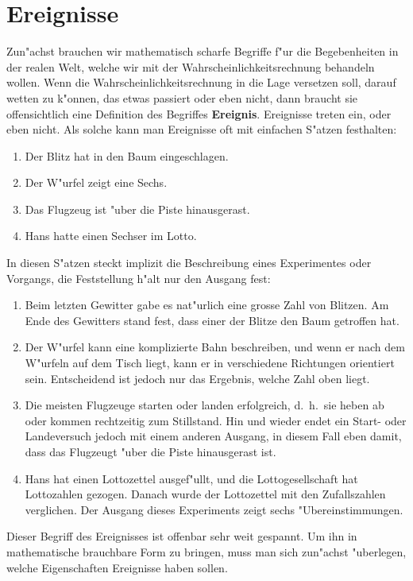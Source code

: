 \section{Ereignisse\label{section-begriffe}}
Zun"achst brauchen wir mathematisch scharfe Begriffe f"ur die Begebenheiten
in der realen Welt, welche wir mit der Wahrscheinlichkeitsrechnung behandeln
wollen. Wenn die Wahrscheinlichkeitsrechnung in die Lage versetzen soll,
darauf wetten zu k"onnen, das etwas passiert oder eben nicht, dann braucht
sie offensichtlich eine Definition des Begriffes {\bf Ereignis}.
Ereignisse treten ein, oder eben nicht.
Als solche kann man Ereignisse oft mit einfachen S"atzen festhalten:
\begin{enumerate}
\item Der Blitz hat in den Baum eingeschlagen.
\item Der W"urfel zeigt eine Sechs.
\item Das Flugzeug ist "uber die Piste hinausgerast.
\item Hans hatte einen Sechser im Lotto.
\end{enumerate}
In diesen S"atzen steckt implizit die Beschreibung eines Experimentes oder
Vorgangs, die Feststellung h"alt nur den Ausgang fest:
\begin{enumerate}
\item Beim letzten Gewitter gabe es nat"urlich eine grosse
Zahl von Blitzen.
Am Ende des Gewitters stand fest, dass einer der Blitze den Baum
getroffen hat.
\item Der W"urfel kann eine komplizierte Bahn beschreiben, und wenn
er nach dem W"urfeln auf dem Tisch liegt, kann er in verschiedene
Richtungen orientiert sein. Entscheidend ist jedoch nur das Ergebnis,
welche Zahl oben liegt.
\item Die meisten Flugzeuge starten oder landen erfolgreich, d.~h.~sie
heben ab oder kommen rechtzeitig zum Stillstand. Hin und wieder
endet ein Start- oder Landeversuch jedoch mit einem anderen Ausgang,
in diesem Fall eben damit, dass das Flugzeugt "uber die Piste
hinausgerast ist.
\item Hans hat einen Lottozettel ausgef"ullt, und die Lottogesellschaft
hat Lottozahlen gezogen. Danach wurde der Lottozettel mit den Zufallszahlen
verglichen. Der Ausgang dieses Experiments zeigt sechs "Ubereinstimmungen.
\end{enumerate}
Dieser Begriff des Ereignisses ist offenbar sehr weit gespannt.
Um ihn in mathematische brauchbare Form zu bringen,
muss man sich zun"achst "uberlegen, welche Eigenschaften Ereignisse haben
sollen.

